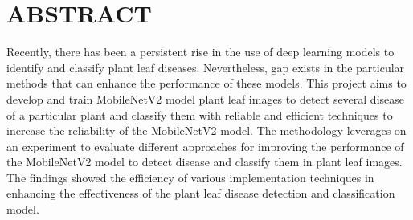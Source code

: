 \chapter*{ABSTRACT}
Recently, there has been a persistent rise in the use of deep learning models to identify and classify plant leaf diseases. Nevertheless, gap exists in the particular methods that can enhance the performance of these models. This project aims to develop and train MobileNetV2 model plant leaf images to detect several disease of a particular plant and classify them with reliable and efficient techniques to increase the reliability of the MobileNetV2 model. The methodology leverages on an experiment to evaluate different approaches for improving the performance of the MobileNetV2 model to detect disease and classify them in plant leaf images. The findings showed the efficiency of various implementation techniques in enhancing the effectiveness of the plant leaf disease detection and classification model.
